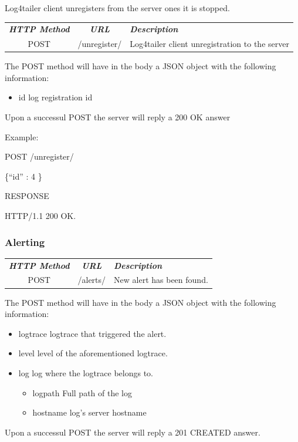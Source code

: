 Log4tailer client unregisters from the server ones it is stopped.

\begin{flushleft}
 \begin{tabular}{|c|c|l|}
 \hline 
 \rowcolor{cyan} {\color{white} \textit{\textbf{HTTP Method}}} &  {\color{white} 
  \textit{\textbf{URL}}}  & {\color{white} 
 \textit{\textbf{Description}}}\\
 POST & /unregister/ & Log4tailer client unregistration to the server\\
 \hline
\end{tabular}
\end{flushleft}
The POST method will have in the body a JSON object with the following information:

\begin{itemize}
 \item id log registration id 
\end{itemize}

\noindent
Upon a successul POST the server will reply a 200 OK answer

\noindent
Example:

\begin{codeexample}

POST /unregister/

 \{``id'' : 4 \}

RESPONSE

HTTP/1.1 200 OK.
\end{codeexample}

\subsubsection{Alerting}

\begin{flushleft}
 \begin{tabular}{|c|c|l|}
 \hline 
 \rowcolor{cyan} {\color{white} \textit{\textbf{HTTP Method}}} &  {\color{white} 
  \textit{\textbf{URL}}}  & {\color{white} 
 \textit{\textbf{Description}}}\\
 POST & /alerts/ & New alert has been found.\\
 \hline
\end{tabular}
\end{flushleft}
The POST method will have in the body a JSON object with the following information:

\begin{itemize}
 \item logtrace logtrace that triggered the alert.
 \item level level of the aforementioned logtrace.
 \item log log where the logtrace belongs to.
    \begin{itemize}
      \item logpath Full path of the log 
      \item hostname log's server hostname
    \end{itemize}
\end{itemize}
Upon a successul POST the server will reply a 201 CREATED answer.

